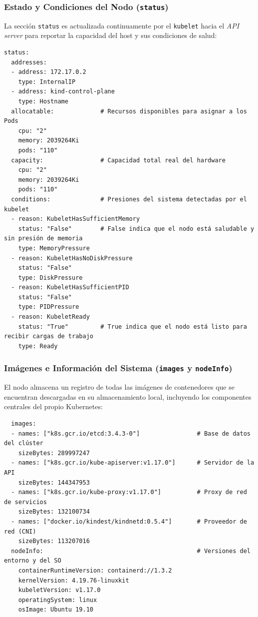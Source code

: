 \subsubsection{Estado y Condiciones del Nodo (\texttt{status})}
La sección \texttt{status} es actualizada continuamente por el \texttt{kubelet} hacia el \textit{API server} para reportar la capacidad del host y sus condiciones de salud:

\begin{verbatim}
status:
  addresses:
  - address: 172.17.0.2
    type: InternalIP
  - address: kind-control-plane
    type: Hostname
  allocatable:             # Recursos disponibles para asignar a los Pods
    cpu: "2"
    memory: 2039264Ki
    pods: "110"
  capacity:                # Capacidad total real del hardware
    cpu: "2"
    memory: 2039264Ki
    pods: "110"
  conditions:              # Presiones del sistema detectadas por el kubelet
  - reason: KubeletHasSufficientMemory
    status: "False"        # False indica que el nodo está saludable y sin presión de memoria
    type: MemoryPressure
  - reason: KubeletHasNoDiskPressure
    status: "False"
    type: DiskPressure
  - reason: KubeletHasSufficientPID
    status: "False"
    type: PIDPressure
  - reason: KubeletReady
    status: "True"         # True indica que el nodo está listo para recibir cargas de trabajo
    type: Ready
\end{verbatim}

\subsubsection{Imágenes e Información del Sistema (\texttt{images} y \texttt{nodeInfo})}
El nodo almacena un registro de todas las imágenes de contenedores que se encuentran descargadas en su almacenamiento local, incluyendo los componentes centrales del propio Kubernetes:

\begin{verbatim}
  images:
  - names: ["k8s.gcr.io/etcd:3.4.3-0"]                # Base de datos del clúster
    sizeBytes: 289997247
  - names: ["k8s.gcr.io/kube-apiserver:v1.17.0"]      # Servidor de la API
    sizeBytes: 144347953
  - names: ["k8s.gcr.io/kube-proxy:v1.17.0"]          # Proxy de red de servicios
    sizeBytes: 132100734
  - names: ["docker.io/kindest/kindnetd:0.5.4"]       # Proveedor de red (CNI)
    sizeBytes: 113207016
  nodeInfo:                                           # Versiones del entorno y del SO
    containerRuntimeVersion: containerd://1.3.2
    kernelVersion: 4.19.76-linuxkit
    kubeletVersion: v1.17.0
    operatingSystem: linux
    osImage: Ubuntu 19.10
\end{verbatim}

